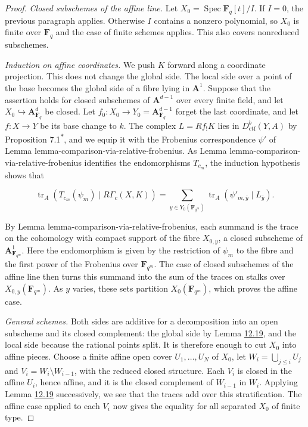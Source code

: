 \documentclass[11pt]{article}
\newcommand{\bpout}[1]{#1\textsuperscript{\hyperlink{bp-outside}{\ensuremath{\ast}}}}
\begin{document}
\begin{proof}[{Proof}]
\emph{Closed subschemes of the affine line.} Let \(X_0=\operatorname{Spec}\mathbf F_q[t]/I\). If \(I=0\), the previous paragraph applies. Otherwise \(I\) contains a nonzero polynomial, so \(X_0\) is finite over \(\mathbf F_q\) and the case of finite schemes applies. This also covers nonreduced subschemes.

\emph{Induction on affine coordinates.} We push \(K\) forward along a coordinate projection. This does not change the global side. The local side over a point of the base becomes the global side of a fibre lying in \(\mathbf A^1\). Suppose that the assertion holds for closed subschemes of \(\mathbf A^{d-1}\) over every finite field, and let \(X_0\hookrightarrow\mathbf A^d_{\mathbf F_q}\) be closed. Let \(f_0:X_0\to Y_0=\mathbf A^{d-1}_{\mathbf F_q}\) forget the last coordinate, and let \(f:X\to Y\) be its base change to \(k\). The complex \(L=Rf_!K\) lies in \(D^b_{\mathrm{ctf}}(Y,A)\) by Proposition \bpout{7.1}, and we equip it with the Frobenius correspondence \(\psi'\) of Lemma lemma-comparison-via-relative-frobenius. As Lemma lemma-comparison-via-relative-frobenius identifies the endomorphisms \(T_{c_m}\), the induction hypothesis shows that

\[
\operatorname{tr}_A(T_{c_m}(\psi_m)\mid R\Gamma_c(X,K))
=\sum_{y\in Y_0(\mathbf F_{q^m})}
\operatorname{tr}_A(\psi'_{m,\bar y}\mid L_{\bar y}).
\]

By Lemma lemma-comparison-via-relative-frobenius, each summand is the trace on the cohomology with compact support of the fibre \(X_{0,y}\), a closed subscheme of \(\mathbf A^1_{\mathbf F_{q^m}}\). Here the endomorphism is given by the restriction of \(\psi_m\) to the fibre and the first power of the Frobenius over \(\mathbf F_{q^m}\). The case of closed subschemes of the affine line then turns this summand into the sum of the traces on stalks over \(X_{0,y}(\mathbf F_{q^m})\). As \(y\) varies, these sets partition \(X_0(\mathbf F_{q^m})\), which proves the affine case.

\emph{General schemes.} Both sides are additive for a decomposition into an open subscheme and its closed complement: the global side by Lemma \hyperref[bp283]{12.19}, and the local side because the rational points split. It is therefore enough to cut \(X_0\) into affine pieces. Choose a finite affine open cover \(U_1,\ldots,U_N\) of \(X_0\), let \(W_i=\bigcup_{j\leq i}U_j\) and \(V_i=W_i\setminus W_{i-1}\), with the reduced closed structure. Each \(V_i\) is closed in the affine \(U_i\), hence affine, and it is the closed complement of \(W_{i-1}\) in \(W_i\). Applying Lemma \hyperref[bp283]{12.19} successively, we see that the traces add over this stratification. The affine case applied to each \(V_i\) now gives the equality for all separated \(X_0\) of finite type.
\end{proof}
\end{document}
